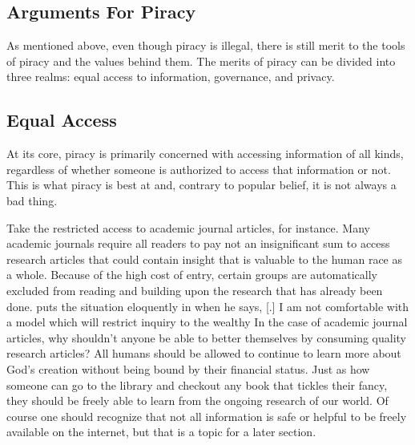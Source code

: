 \documentclass[onecolumn, 12pt]{article}
\begin{document}
\begin{refsection}
\section{Arguments For Piracy}
As mentioned above, even though piracy is illegal, there is still merit to the tools of
piracy and the values behind them. The merits of piracy can be divided into three realms:
equal access to information, governance, and privacy.

\subsection{Equal Access}
At its core, piracy is primarily concerned with accessing information of all kinds,
regardless of whether someone is authorized to access that information or not. This is
what piracy is best at and, contrary to popular belief, it is not always a bad thing.

Take the restricted access to academic journal articles, for instance. Many academic
journals require all readers to pay not an insignificant sum to access research articles
that could contain insight that is valuable to the human race as a whole. Because of the
high cost of entry, certain groups are automatically excluded from reading and building
upon the research that has already been done. \citeauthor{barlow:wine} puts the situation
eloquently in  when he says, [.]{%
  I am not comfortable with a model which will restrict inquiry to the wealthy%
}
In the case of academic journal articles, why shouldn't anyone be able to better
themselves by consuming quality research articles? All humans should be allowed
to continue to learn more about God's creation without being bound by their
financial status. Just as how someone can go to the library and checkout any
book that tickles their fancy, they should be freely able to learn from the
ongoing research of our world. Of course one should recognize that not all
information is safe or helpful to be freely available on the internet, but that
is a topic for a later section.


\end{refsection}
\end{document}
